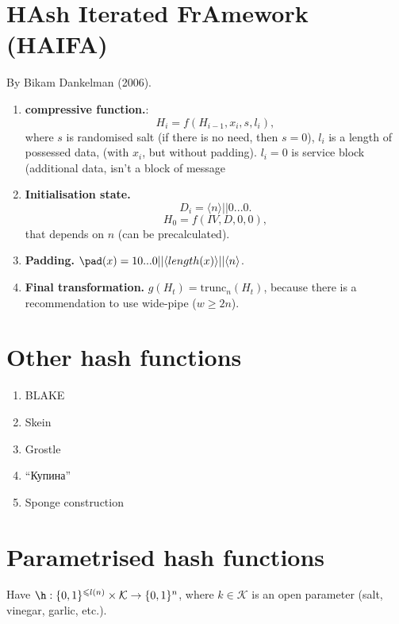 \section{HAsh Iterated FrAmework (HAIFA)}

\begin{definition}
    By Bikam Dankelman (2006).
    \begin{enumerate}
        \item \textbf{compressive function.}:
            $$H_i = f(H_{i-1}, x_i, s, l_i),$$
            where $s$ is randomised salt (if there is no need, then $s=0$),
            $l_i$ is a length of possessed data, (with $x_i$, but without padding).
            $l_i = 0$ is service block (additional data, isn't a block of message
        \item \textbf{Initialisation state.}
            $$D_i = \langle n \rangle || 0 ... 0.$$
            $$H_0 = f(IV, D, 0, 0),$$
            that depends on $n$ (can be precalculated).
        \item \textbf{Padding.} $\pad(x) = 10...0||\langle length(x) \rangle || \langle n \rangle$.
        \item \textbf{Final transformation.} $g(H_t) = \mathrm{trunc}_n(H_t)$, because there is
            a recommendation to use wide-pipe ($w \geqslant 2n$).
    \end{enumerate}
\end{definition}

\section{Other hash functions}

\begin{enumerate}
    \item BLAKE
    \item Skein
    \item Grostle
    \item ``Купина''
    \item Sponge construction
\end{enumerate}

\section{Parametrised hash functions}

Have $\h: \{0, 1\}^{\leqslant l(n)}  \times \mathcal{K} \rightarrow \{0, 1\}^n$,
where $k \in \mathcal{K}$ is an open parameter (salt, vinegar, garlic, etc.).

